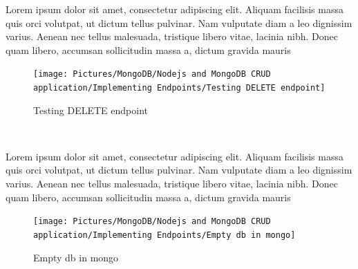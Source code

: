 \begin{spacing}{1.2}
\par Lorem ipsum dolor sit amet, consectetur adipiscing elit. Aliquam facilisis massa quis orci volutpat, ut dictum tellus pulvinar. Nam vulputate diam a leo dignissim varius. Aenean nec tellus malesuada, tristique libero vitae, lacinia nibh. Donec quam libero, accumsan sollicitudin massa a, dictum gravida mauris
\\
\begin{figure}[!htb] 
\begin{center} 
\texttt{[image: Pictures/MongoDB/Nodejs and MongoDB CRUD  application/Implementing Endpoints/Testing DELETE endpoint]} 
\end{center} 
\caption{Testing DELETE endpoint} 
\end{figure}  \FloatBarrier
\\

\par Lorem ipsum dolor sit amet, consectetur adipiscing elit. Aliquam facilisis massa quis orci volutpat, ut dictum tellus pulvinar. Nam vulputate diam a leo dignissim varius. Aenean nec tellus malesuada, tristique libero vitae, lacinia nibh. Donec quam libero, accumsan sollicitudin massa a, dictum gravida mauris
\\
\begin{figure}[!htb] 
\begin{center} 
\texttt{[image: Pictures/MongoDB/Nodejs and MongoDB CRUD  application/Implementing Endpoints/Empty db in mongo]} 
\end{center} 
\caption{Empty db in mongo} 
\end{figure}  \FloatBarrier
\\

\end{spacing}